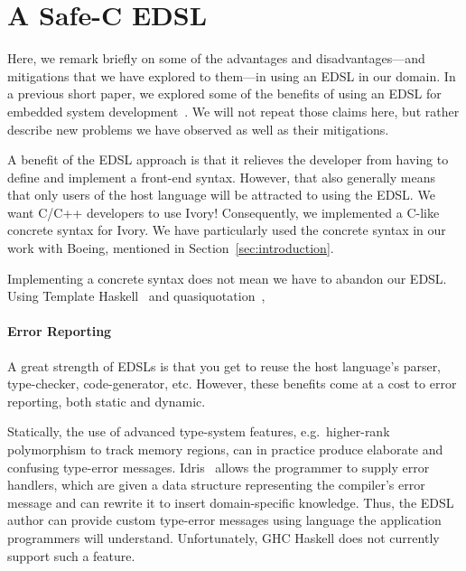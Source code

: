 \section{A Safe-C EDSL}
\label{sec:edsl}

Here, we remark briefly on some of the advantages and disadvantages---and
mitigations that we have explored to them---in using an EDSL in our domain. In a
previous short paper, we explored some of the benefits of using an EDSL for
embedded system development~\cite{smaccm}. We will not repeat those claims here,
but rather describe new problems we have observed as well as their mitigations.

A benefit of the EDSL approach is that it relieves the developer from having to
define and implement a front-end syntax. However, that also generally means that
only users of the host language will be attracted to using the
EDSL. We want C/C++ developers to use Ivory! Consequently, we implemented a
C-like concrete syntax for Ivory. We have particularly used the concrete syntax
in our work with Boeing, mentioned in Section~\ref{sec:introduction}.

Implementing a concrete syntax does not mean we have to abandon our EDSL. Using
Template Haskell~\cite{} and quasiquotation~\cite{}, 




\paragraph{Error Reporting}
A great strength of EDSLs is that you get to reuse the host language's parser,
type-checker, code-generator, etc. However, these benefits come at a cost to
error reporting, both static and dynamic. 

Statically, the use of advanced type-system features, e.g.\ higher-rank
polymorphism to track memory regions, can in practice produce elaborate and
confusing type-error messages. Idris~\cite{christiansen2014reflect} allows the
programmer to supply error handlers, which are given a data structure
representing the compiler's error message and can rewrite it to insert
domain-specific knowledge. Thus, the EDSL author can provide custom type-error
messages using language the application programmers will understand.
Unfortunately, GHC Haskell does not currently support such a feature.

